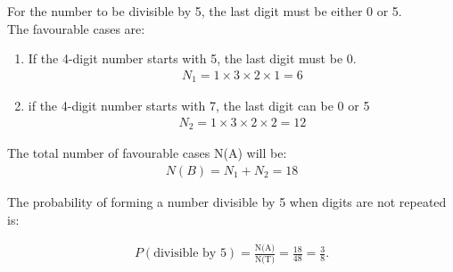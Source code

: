\documentclass{article}
\begin{document}
For the number to be divisible by 5, the last digit must be either 0 or 5. \\
The favourable cases are:
\begin{enumerate}
\item If the 4-digit number starts with 5, the last digit must be 0.
	\begin{align}
		N_{1}= 1 \times 3 \times 2 \times 1=6
	\end{align}
\item if the 4-digit number starts with 7, the last digit can be 0 or 5
	\begin{align}
		N_{2}= 1 \times 3 \times 2 \times 2=12
	\end{align}
	
\end{enumerate}

The total number of favourable cases N(A) will be:
	\begin{align}
		N(B)=N_{1}+N_{2}= 18
	\end{align}
	
The probability of forming a number divisible by 5 when digits are not repeated is:

\begin{align}
P(\text{divisible by 5}) = \frac{\text{N(A)}}{\text{N(T)}} = \frac{18}{48} = \frac{3}{8}.
\end{align}
\end{document}
